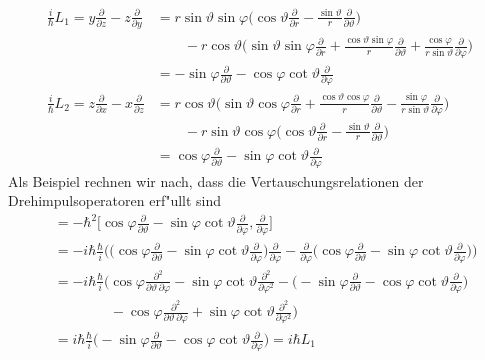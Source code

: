 \begin{align*}
\frac{i}{\hbar}L_1
=
y\frac{\partial}{\partial z}-z\frac{\partial}{\partial y}
&=
r\sin\vartheta\sin\varphi
\biggl(
\cos\vartheta
\frac{\partial}{\partial r}
-
\frac{\sin\vartheta}{r}
\frac{\partial}{\partial\vartheta}
\biggr)
\\
&\qquad
-
r\cos\vartheta
\biggl(
\sin\vartheta\sin\varphi
\frac{\partial}{\partial r}
+
\frac{\cos\vartheta\sin\varphi}{r}
\frac{\partial}{\partial\vartheta}
+
\frac{\cos\varphi}{r\sin\vartheta}
\frac{\partial}{\partial\varphi}
\biggr)
\\
&=
-\sin\varphi\frac{\partial}{\partial\vartheta}
-\cos\varphi\cot\vartheta\frac{\partial}{\partial\varphi}
\\
\frac{i}{\hbar}L_2
=
z\frac{\partial}{\partial x}-x\frac{\partial}{\partial z}
&=
r\cos\vartheta
\biggl(
\sin\vartheta\cos\varphi
\frac{\partial}{\partial r}
+
\frac{\cos\vartheta\cos\varphi}{r}
\frac{\partial}{\partial\vartheta}
-
\frac{\sin\varphi}{r\sin\vartheta}
\frac{\partial}{\partial\varphi}
\biggr)
\\
&\qquad
-
r\sin\vartheta\cos\varphi
\biggl(
\cos\vartheta
\frac{\partial}{\partial r}
-
\frac{\sin\vartheta}{r}
\frac{\partial}{\partial\vartheta}
\biggr)
\\
&=
\cos\varphi\frac{\partial}{\partial\vartheta}
-\sin\varphi\cot\vartheta\frac{\partial}{\partial\varphi}
\end{align*}
Als Beispiel rechnen wir nach, dass die Vertauschungsrelationen der
Drehimpulsoperatoren erf"ullt sind
\begin{align*}
[L_2,L_3]
&=-\hbar^2\biggl[
\cos\varphi\frac{\partial}{\partial\vartheta}
-\sin\varphi\cot\vartheta\frac{\partial}{\partial\varphi}
,\frac{\partial}{\partial\varphi}
\biggr]
\\
&=
-i\hbar\frac{\hbar}{i}\biggl(
\biggl(
\cos\varphi\frac{\partial}{\partial\vartheta}
-\sin\varphi\cot\vartheta\frac{\partial}{\partial\varphi}
\biggr)
\frac{\partial}{\partial\varphi}
-
\frac{\partial}{\partial\varphi}
\biggl(
\cos\varphi\frac{\partial}{\partial\vartheta}
-\sin\varphi\cot\vartheta\frac{\partial}{\partial\varphi}
\biggr)
\biggr)
\\
&=
-i\hbar\frac{\hbar}{i}\biggl(
\cos\varphi\frac{\partial^2}{\partial\vartheta\,\partial\varphi}
-\sin\varphi\cot\vartheta\frac{\partial^2}{\partial\varphi^2}
-
\biggl(
-\sin\varphi\frac{\partial}{\partial\vartheta}
-\cos\varphi\cot\vartheta\frac{\partial}{\partial\varphi}
\biggr)
\\
&\qquad\qquad
-
\cos\varphi\frac{\partial^2}{\partial\vartheta\,\partial\varphi}
+\sin\varphi\cot\vartheta\frac{\partial^2}{\partial\varphi^2}
\biggr)
\\
&=
i\hbar\frac{\hbar}{i}\biggl(
-
\sin\varphi\frac{\partial}{\partial\vartheta}
-
\cos\varphi\cot\vartheta\frac{\partial}{\partial\varphi}
\biggr)
=i\hbar L_1
\end{align*}

